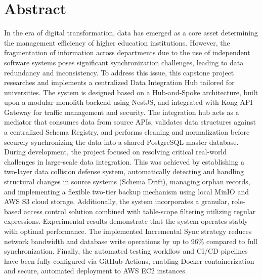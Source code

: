 \section*{Abstract}
In the era of digital transformation, data has emerged as a core asset determining the management efficiency of higher education institutions. However, the fragmentation of information across departments due to the use of independent software systems poses significant synchronization challenges, leading to data redundancy and inconsistency.
To address this issue, this capstone project researches and implements a centralized Data Integration Hub tailored for universities. The system is designed based on a Hub-and-Spoke architecture, built upon a modular monolith backend using NestJS, and integrated with Kong API Gateway for traffic management and security. The integration hub acts as a mediator that consumes data from source APIs, validates data structures against a centralized Schema Registry, and performs cleaning and normalization before securely synchronizing the data into a shared PostgreSQL master database.
During development, the project focused on resolving critical real-world challenges in large-scale data integration. This was achieved by establishing a two-layer data collision defense system, automatically detecting and handling structural changes in source systems (Schema Drift), managing orphan records, and implementing a flexible two-tier backup mechanism using local MinIO and AWS S3 cloud storage. Additionally, the system incorporates a granular, role-based access control solution combined with table-scope filtering utilizing regular expressions.
Experimental results demonstrate that the system operates stably with optimal performance. The implemented Incremental Sync strategy reduces network bandwidth and database write operations by up to 96\% compared to full synchronization. Finally, the automated testing workflow and CI/CD pipelines have been fully configured via GitHub Actions, enabling Docker containerization and secure, automated deployment to AWS EC2 instances.